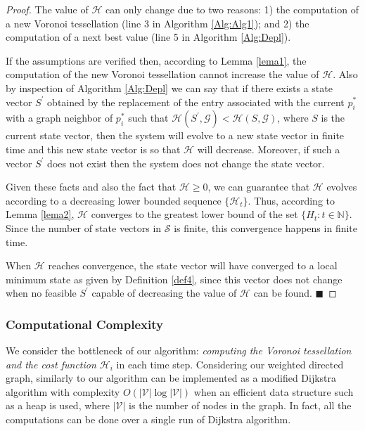 \documentclass[smallcondensed]{svjour3}
\newcommand*{\QEDA}{\hfill\ensuremath{\blacksquare}}%
\begin{document}
\begin{proof}
%
The value of $\mathcal H$ can only change due to two reasons: 1) the computation of a new Voronoi tessellation (line 3 in Algorithm \ref{Alg:Alg1}); and 2) the computation of a next best value (line 5 in Algorithm \ref{Alg:Depl}).

If the assumptions are verified then, according to Lemma \ref{lema1}, the computation of the new Voronoi tessellation cannot increase the value of $\mathcal H$. Also by inspection of Algorithm \ref{Alg:Depl} we can say that if there exists a state vector $S^\prime$ obtained by the replacement of the entry associated with the current $p_i ^*$ with a graph neighbor of $p_i^*$ such that $\mathcal H(S^\prime , \mathcal G) < \mathcal H(S,\mathcal G)$, where $S$ is the current state vector, then the system will evolve to a new state vector in finite time and this new state vector is so that $\mathcal H$ will decrease. Moreover, if such a vector $S^\prime$ does not exist then the system does not change the state vector.

Given these facts and also the fact that $\mathcal H \geq 0 $, we can guarantee that $\mathcal H$ evolves according to a decreasing lower bounded sequence $\{\mathcal H_t\}$. Thus, according to Lemma \ref{lema2}, $\mathcal H$ converges to the greatest lower bound of the set $\{H_t: t \in \mathbb N \}$. Since the number of state vectors in $\mathcal{S}$ is finite, this convergence happens in finite time.

When $\mathcal H$ reaches convergence, the state vector will have converged to a local minimum state as given by Definition \ref{def4}, since this vector does not change when no feasible $S^\prime$ capable of decreasing the value of $\mathcal H$ can be found.
\QEDA
\end{proof}
%

\subsubsection{Computational Complexity}
\label{compcomplexity}

We consider the bottleneck of our algorithm: \textit{computing the Voronoi tessellation and the cost function $\mathcal H_i$} in each time step. Considering our weighted directed graph, similarly to \citep{Bhattacharya2013IJRR} our algorithm can be implemented as a modified Dijkstra algorithm with complexity $O(|\mathcal{V}| \log |\mathcal{V}|)$ when an efficient data structure such as a heap is used, where $|\mathcal{V}|$ is the number of nodes in the graph. In fact, all the computations can be done over a single run of Dijkstra algorithm.
\end{document}
